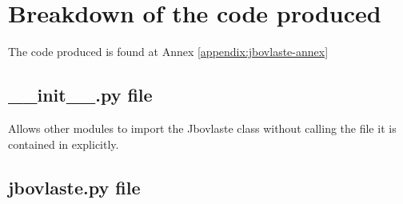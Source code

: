 \section{Breakdown of the code produced}

The code produced is found at Annex \ref{appendix:jbovlaste-annex}

\subsection{\_\_init\_\_.py file}

Allows other modules to import the Jbovlaste class without calling the file it is contained in explicitly.

\subsection{jbovlaste.py file}

